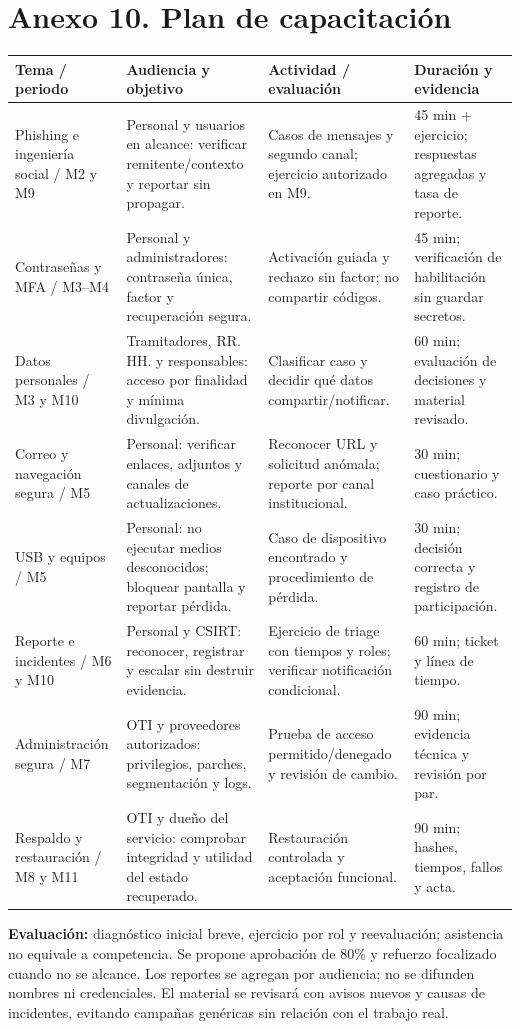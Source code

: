 \documentclass[10pt,a4paper]{article}
\newcommand{\anexo}[2]{\clearpage\section*{Anexo #1. #2}\addcontentsline{toc}{section}{Anexo #1. #2}}
\newcommand{\cabecera}[1]{\textbf{#1}}
\begin{document}
\anexo{10}{Plan de capacitación}
\begin{TablaCompacta}
\begin{longtable}{P{31mm}P{43mm}P{46mm}P{39mm}}
\toprule\cabecera{Tema / periodo} & \cabecera{Audiencia y objetivo} & \cabecera{Actividad / evaluación} & \cabecera{Duración y evidencia}\\\midrule\endhead
Phishing e ingeniería social / M2 y M9 & Personal y usuarios en alcance: verificar remitente/contexto y reportar sin propagar. & Casos de mensajes y segundo canal; ejercicio autorizado en M9. & 45 min + ejercicio; respuestas agregadas y tasa de reporte.\\
Contraseñas y MFA / M3--M4 & Personal y administradores: contraseña única, factor y recuperación segura. & Activación guiada y rechazo sin factor; no compartir códigos. & 45 min; verificación de habilitación sin guardar secretos.\\
Datos personales / M3 y M10 & Tramitadores, RR. HH. y responsables: acceso por finalidad y mínima divulgación. & Clasificar caso y decidir qué datos compartir/notificar. & 60 min; evaluación de decisiones y material revisado.\\
Correo y navegación segura / M5 & Personal: verificar enlaces, adjuntos y canales de actualizaciones. & Reconocer URL y solicitud anómala; reporte por canal institucional. & 30 min; cuestionario y caso práctico.\\
USB y equipos / M5 & Personal: no ejecutar medios desconocidos; bloquear pantalla y reportar pérdida. & Caso de dispositivo encontrado y procedimiento de pérdida. & 30 min; decisión correcta y registro de participación.\\
Reporte e incidentes / M6 y M10 & Personal y CSIRT: reconocer, registrar y escalar sin destruir evidencia. & Ejercicio de triage con tiempos y roles; verificar notificación condicional. & 60 min; ticket y línea de tiempo.\\
Administración segura / M7 & OTI y proveedores autorizados: privilegios, parches, segmentación y logs. & Prueba de acceso permitido/denegado y revisión de cambio. & 90 min; evidencia técnica y revisión por par.\\
Respaldo y restauración / M8 y M11 & OTI y dueño del servicio: comprobar integridad y utilidad del estado recuperado. & Restauración controlada y aceptación funcional. & 90 min; hashes, tiempos, fallos y acta.\\\bottomrule
\end{longtable}
\end{TablaCompacta}
\textbf{Evaluación:} diagnóstico inicial breve, ejercicio por rol y reevaluación; asistencia no equivale a competencia. Se propone aprobación de 80\% y refuerzo focalizado cuando no se alcance. Los reportes se agregan por audiencia; no se difunden nombres ni credenciales. El material se revisará con avisos nuevos y causas de incidentes, evitando campañas genéricas sin relación con el trabajo real.
\end{document}
